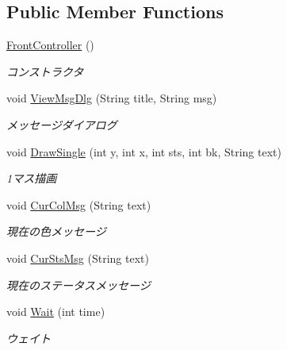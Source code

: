 \subsection*{Public Member Functions}
\begin{DoxyCompactItemize}
\item 
\hyperlink{classjp_1_1gr_1_1java__conf_1_1yuta__yoshinaga_1_1reversi_1_1controller_1_1_front_controller_a918d736b7b4d8672076c15f8ca05075c}{Front\+Controller} ()
\begin{DoxyCompactList}\small\item\em コンストラクタ \end{DoxyCompactList}\item 
void \hyperlink{classjp_1_1gr_1_1java__conf_1_1yuta__yoshinaga_1_1reversi_1_1controller_1_1_front_controller_a03f8b3b1b7991cfb075f8708d4041ddb}{View\+Msg\+Dlg} (String title, String msg)
\begin{DoxyCompactList}\small\item\em メッセージダイアログ \end{DoxyCompactList}\item 
void \hyperlink{classjp_1_1gr_1_1java__conf_1_1yuta__yoshinaga_1_1reversi_1_1controller_1_1_front_controller_acf079ebc5949ce36b15c56158c9b9cfa}{Draw\+Single} (int y, int x, int sts, int bk, String text)
\begin{DoxyCompactList}\small\item\em 1マス描画 \end{DoxyCompactList}\item 
void \hyperlink{classjp_1_1gr_1_1java__conf_1_1yuta__yoshinaga_1_1reversi_1_1controller_1_1_front_controller_ac49c44c8bb767770364c52164b699110}{Cur\+Col\+Msg} (String text)
\begin{DoxyCompactList}\small\item\em 現在の色メッセージ \end{DoxyCompactList}\item 
void \hyperlink{classjp_1_1gr_1_1java__conf_1_1yuta__yoshinaga_1_1reversi_1_1controller_1_1_front_controller_a49315230e704778721afb73c59e14d88}{Cur\+Sts\+Msg} (String text)
\begin{DoxyCompactList}\small\item\em 現在のステータスメッセージ \end{DoxyCompactList}\item 
void \hyperlink{classjp_1_1gr_1_1java__conf_1_1yuta__yoshinaga_1_1reversi_1_1controller_1_1_front_controller_af513d1ccfca9fc00f93fb650f1f08b05}{Wait} (int time)
\begin{DoxyCompactList}\small\item\em ウェイト \end{DoxyCompactList}\end{DoxyCompactItemize}
